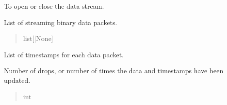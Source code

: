 \documentclass[letterpaper,10pt,english]{sphinxmanual}
\begin{document}
\begin{fulllineitems}
\begin{fulllineitems}
\label{\detokenize{PodApi.Stream.Collect:PodApi.Stream.Collect.DataHose.Hose.deviceValve}}
\pysigstartsignatures
{}
\pysigstopsignatures
\sphinxAtStartPar
To open or close the data stream.
\begin{quote}\begin{description}
\sphinxAtStartPar
{\hyperref[\detokenize{PodApi.Stream.Collect:PodApi.Stream.Collect.DeviceValve.Valve}]{}}

\end{description}\end{quote}

\end{fulllineitems}


\begin{fulllineitems}
\label{\detokenize{PodApi.Stream.Collect:PodApi.Stream.Collect.DataHose.Hose.data}}
\pysigstartsignatures
{}
\pysigstopsignatures
\sphinxAtStartPar
List of streaming binary data packets.
\begin{quote}\begin{description}
\sphinxAtStartPar
list{[}{\hyperref[\detokenize{PodApi.Packets:PodApi.Packets.Packet.Packet}]{}}|None{]}

\end{description}\end{quote}

\end{fulllineitems}



\begin{fulllineitems}

\pysigstartsignatures
{}
\pysigstopsignatures
\sphinxAtStartPar
List of timestamps for each data packet.

\end{fulllineitems}


\begin{fulllineitems}
\label{\detokenize{PodApi.Stream.Collect:PodApi.Stream.Collect.DataHose.Hose.numDrops}}
\pysigstartsignatures
{}
\pysigstopsignatures
\sphinxAtStartPar
Number of drops, or number of times the data and             timestamps have been updated.
\begin{quote}\begin{description}
\sphinxAtStartPar
int


\end{description}
\end{quote}
\end{fulllineitems}
\end{fulllineitems}
\end{document}
